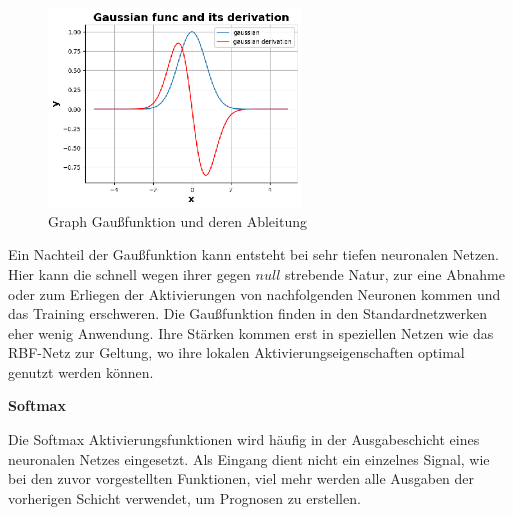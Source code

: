\begin{figure}[!ht]
	\includegraphics[width=0.6\textwidth]{content/chapter_basics/plots/gaussian_func_plot.eps}
	\centering
	\caption{Graph Gaußfunktion und deren Ableitung}
	\label{img:gaussian_func_graph}
\end{figure}

Ein Nachteil der Gaußfunktion kann entsteht bei sehr tiefen neuronalen Netzen. Hier kann die schnell wegen ihrer gegen $null$ strebende Natur, zur eine Abnahme oder zum Erliegen der Aktivierungen von nachfolgenden Neuronen kommen und das Training erschweren. Die Gaußfunktion finden in den Standardnetzwerken eher wenig Anwendung. Ihre Stärken kommen erst in speziellen Netzen wie das RBF-Netz zur Geltung, wo ihre lokalen Aktivierungseigenschaften optimal genutzt werden können.\vspace{0.2cm}

%
\textbf{Softmax}\vspace{0.2cm}


Die Softmax Aktivierungsfunktionen wird häufig in der Ausgabeschicht eines neuronalen Netzes eingesetzt. Als Eingang dient nicht ein einzelnes Signal, wie bei den zuvor vorgestellten Funktionen, viel mehr werden alle Ausgaben der vorherigen Schicht verwendet, um Prognosen zu erstellen.


